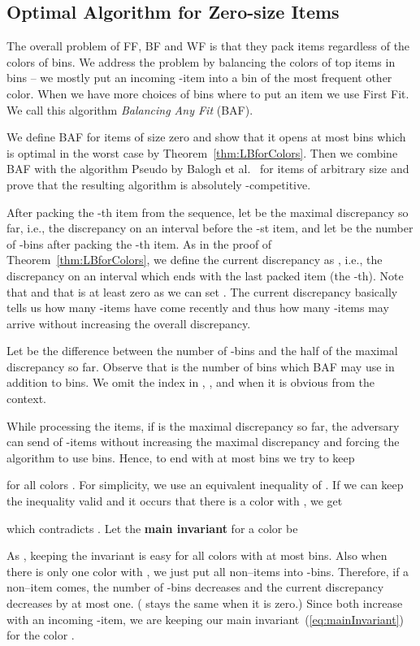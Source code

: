 \documentclass[11pt,a4paper]{article}
\begin{document}
\subsection{Optimal Algorithm for Zero-size Items}\label{sec:zeroSizeUB}

The overall problem of FF, BF and WF is that they pack items regardless of the colors of bins.
We address the problem by balancing the colors of top items in bins
-- we mostly put an incoming -item into a bin of
the most frequent other color.
When we have more choices of bins where to put an item we use First Fit.
We call this algorithm \textit{Balancing Any Fit} (BAF).

We define BAF for items of size zero
and show that it opens at most  bins
which is optimal in the worst case by Theorem~\ref{thm:LBforColors}.
Then we combine BAF with the algorithm Pseudo by Balogh et al.~\cite{balogh14} for items of arbitrary size
and prove that the resulting algorithm is absolutely -competitive.

After packing the -th item from the sequence, let  be the maximal discrepancy so far, i.e., the discrepancy on
an interval before the -st item, and let  be the number of -bins after packing the -th item.
As in the proof of Theorem~\ref{thm:LBforColors}, we define the current discrepancy as
,
i.e., the discrepancy on an interval which ends with the last packed item (the -th).
Note that  and that  is at least zero as we can set .
The current discrepancy basically tells us how many -items
have come recently and thus how many -items may arrive without increasing the overall discrepancy.

Let  be the difference
between the number of -bins and the half of the maximal discrepancy so far.
Observe that  is the number of bins which BAF may use in addition to  bins.
We omit the index  in , ,  and 
when it is obvious from the context.

While processing the items,
if  is the maximal discrepancy so far,
the adversary can send  of -items
without increasing the maximal discrepancy and forcing the algorithm to use  bins.
Hence, to end with at most  bins we try to keep

for all colors . For simplicity, we use an equivalent inequality of 
.
If we can keep the inequality valid and it occurs that there is a color  with
, we get

which contradicts .
Let the \textbf{main invariant} for a color  be


As , keeping the invariant is easy for all colors
with at most  bins. Also when there is only one
color  with , we just put all non--items
into -bins. Therefore, if a non--item comes, the number of -bins  decreases and the
current discrepancy  decreases by at most one. ( stays the same when it is zero.)
Since both increase with an incoming -item, we are keeping our
main invariant~(\ref{eq:mainInvariant}) for the color . 
\end{document}

